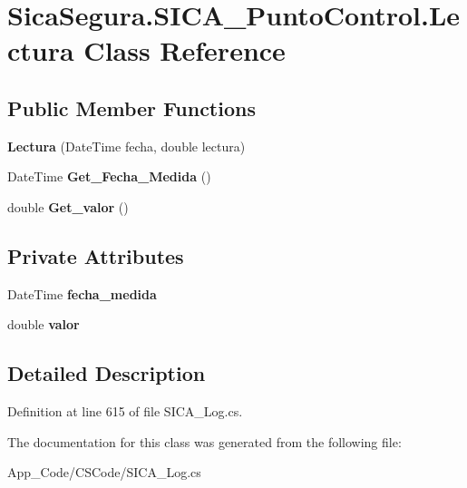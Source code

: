 \hypertarget{class_sica_segura_1_1_s_i_c_a___punto_control_1_1_lectura}{}\section{Sica\+Segura.\+S\+I\+C\+A\+\_\+\+Punto\+Control.\+Lectura Class Reference}
\label{class_sica_segura_1_1_s_i_c_a___punto_control_1_1_lectura}
\subsection*{Public Member Functions}
\begin{DoxyCompactItemize}
\item 
{\bfseries Lectura} (Date\+Time fecha, double lectura)\hypertarget{class_sica_segura_1_1_s_i_c_a___punto_control_1_1_lectura_a812404e74ae64212ff661114d2af8c69}{}\label{class_sica_segura_1_1_s_i_c_a___punto_control_1_1_lectura_a812404e74ae64212ff661114d2af8c69}

\item 
Date\+Time {\bfseries Get\+\_\+\+Fecha\+\_\+\+Medida} ()\hypertarget{class_sica_segura_1_1_s_i_c_a___punto_control_1_1_lectura_af4aadae0a9aefdfe5ceb709079073bb9}{}\label{class_sica_segura_1_1_s_i_c_a___punto_control_1_1_lectura_af4aadae0a9aefdfe5ceb709079073bb9}

\item 
double {\bfseries Get\+\_\+valor} ()\hypertarget{class_sica_segura_1_1_s_i_c_a___punto_control_1_1_lectura_a32f8cc98764a878a1bcbe92b71ed74ea}{}\label{class_sica_segura_1_1_s_i_c_a___punto_control_1_1_lectura_a32f8cc98764a878a1bcbe92b71ed74ea}

\end{DoxyCompactItemize}
\subsection*{Private Attributes}
\begin{DoxyCompactItemize}
\item 
Date\+Time {\bfseries fecha\+\_\+medida}\hypertarget{class_sica_segura_1_1_s_i_c_a___punto_control_1_1_lectura_a983e701c7bf6a75f8d79b37330ac11d6}{}\label{class_sica_segura_1_1_s_i_c_a___punto_control_1_1_lectura_a983e701c7bf6a75f8d79b37330ac11d6}

\item 
double {\bfseries valor}\hypertarget{class_sica_segura_1_1_s_i_c_a___punto_control_1_1_lectura_aa203b39bc97b044954141b811c1f3d7d}{}\label{class_sica_segura_1_1_s_i_c_a___punto_control_1_1_lectura_aa203b39bc97b044954141b811c1f3d7d}

\end{DoxyCompactItemize}


\subsection{Detailed Description}


Definition at line 615 of file S\+I\+C\+A\+\_\+\+Log.\+cs.



The documentation for this class was generated from the following file\+:\begin{DoxyCompactItemize}
\item 
App\+\_\+\+Code/\+C\+S\+Code/S\+I\+C\+A\+\_\+\+Log.\+cs\end{DoxyCompactItemize}
